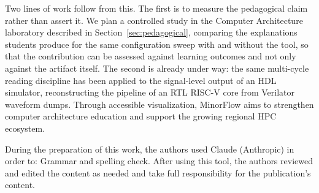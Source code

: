 \documentclass{ceurart}
\begin{document}
Two lines of work follow from this. The first is to measure the pedagogical claim rather than assert it. We plan a controlled study in the Computer Architecture laboratory described in Section~\ref{sec:pedagogical}, comparing the explanations students produce for the same configuration sweep with and without the tool, so that the contribution can be assessed against learning outcomes and not only against the artifact itself. The second is already under way: the same multi-cycle reading discipline has been applied to the signal-level output of an HDL simulator, reconstructing the pipeline of an RTL RISC-V core from Verilator waveform dumps. Through accessible visualization, MinorFlow aims to strengthen computer architecture education and support the growing regional HPC ecosystem.

\begin{aideclaration}
During the preparation of this work, the authors used Claude (Anthropic) in order to: Grammar and spelling check. After using this tool, the authors reviewed and edited the content as needed and take full responsibility for the publication's content.
\end{aideclaration}


\end{document}
